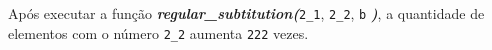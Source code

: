 \documentclass[12pt,varwidth=16cm,border=1pt]{standalone}
\begin{document}
Após executar a função \textbf{\textit{regular\_subtitution(}}\verb+2_1+, \verb+2_2+, \verb+b+ \textbf{\textit{)}}, a quantidade de elementos com o número \verb+2_2+ aumenta \verb+222+ vezes.

\questiomfalse
\end{document}
